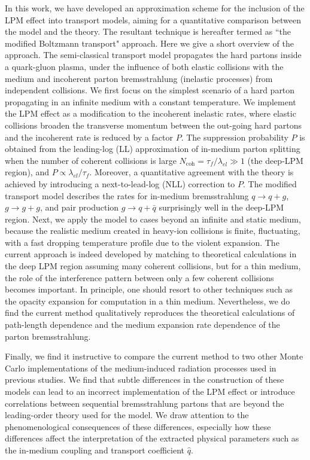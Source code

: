 \documentclass[aps, prc, reprint, amsmath, groupedaddress, nofootinbib]{revtex4-1}
\begin{document}
In this work, we have developed an approximation scheme for the inclusion of the LPM effect into transport models, aiming for a quantitative comparison between the model and the theory.
The resultant technique is hereafter termed as ``the modified Boltzmann transport" approach.
Here we give a short overview of the approach. 
The semi-classical transport model propagates the hard partons inside a quark-gluon plasma, under the influence of both elastic collisions with the medium and incoherent parton bremsstrahlung (inelastic processes) from independent collisions.
We first focus on the simplest scenario of a hard parton propagating in an infinite medium with a constant temperature.
We implement the LPM effect as a modification to the incoherent inelastic rates, where elastic collisions broaden the transverse momentum between the out-going hard partons and the incoherent rate is reduced by a factor $P$.
The suppression probability $P$ is obtained from the leading-log (LL) approximation of in-medium parton splitting when the number of coherent collisions is large $N_{\textrm{coh}} = \tau_f/\lambda_{el} \gg 1$ (the deep-LPM region), and $P \propto \lambda_{el}/\tau_f$.
Moreover, a quantitative agreement with the theory is achieved by introducing a next-to-lead-log (NLL) correction to $P$.
The modified transport model describes the rates for in-medium bremsstrahlung $q\rightarrow q+g$, $g\rightarrow g+g$, and pair production $g\rightarrow q+\bar{q}$ surprisingly well in the deep-LPM region.
Next, we apply the model to cases beyond an infinite and static medium, because the realistic medium created in heavy-ion collisions is finite, fluctuating, with a fast dropping temperature profile due to the violent expansion. 
The current approach is indeed developed by matching to theoretical calculations in the deep LPM region assuming many coherent collisions, but for a thin medium, the role of the interference pattern between only a few coherent collisions becomes important.
In principle, one should resort to other techniques such as the opacity expansion \cite{Wiedemann:2000za,Gyulassy:1999zd} for computation in a thin medium. 
Nevertheless, we do find the current method qualitatively reproduces the theoretical calculations of path-length dependence \cite{CaronHuot:2010bp} and the medium expansion rate dependence \cite{Baier:1998yf} of the parton bremsstrahlung.

Finally, we find it instructive to compare the current method to two other Monte Carlo implementations of the medium-induced radiation processes used in previous studies.
We find that subtle differences in the construction of these models can lead to an incorrect implementation of the LPM effect or introduce correlations between sequential bremsstrahlung partons that are beyond the leading-order theory used for the model.
We draw attention to the phenomenological consequences of these differences,
especially how these differences affect the interpretation of the extracted physical parameters such as the in-medium coupling and transport coefficient $\hat{q}$.
\end{document}
